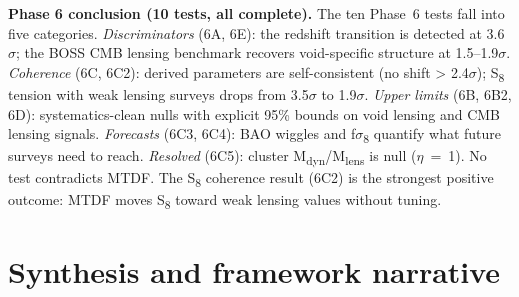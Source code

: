 \documentclass[11pt,a4paper]{article}
\begin{document}
\begin{mdframed}[linecolor=accent,linewidth=0.5pt,backgroundcolor=callout-bg,leftline=true,rightline=true,topline=true,bottomline=true,innerleftmargin=8pt,innerrightmargin=8pt,innertopmargin=6pt,innerbottommargin=6pt]
\textbf{Phase 6 conclusion (10 tests, all complete).}
The ten Phase~6 tests fall into five categories. \emph{Discriminators} (6A, 6E): the redshift transition is detected at 3.6$\sigma$; the BOSS CMB lensing benchmark recovers void-specific structure at 1.5--1.9$\sigma$. \emph{Coherence} (6C, 6C2): derived parameters are self-consistent (no shift > 2.4$\sigma$); S\textsubscript{8} tension with weak lensing surveys drops from 3.5$\sigma$ to 1.9$\sigma$. \emph{Upper limits} (6B, 6B2, 6D): systematics-clean nulls with explicit 95\% bounds on void lensing and CMB lensing signals. \emph{Forecasts} (6C3, 6C4): BAO wiggles and f$\sigma$\textsubscript{8} quantify what future surveys need to reach. \emph{Resolved} (6C5): cluster M\textsubscript{dyn}/M\textsubscript{lens} is null ($\eta$~=~1). No test contradicts MTDF. The S\textsubscript{8} coherence result (6C2) is the strongest positive outcome: MTDF moves S\textsubscript{8} toward weak lensing values without tuning.
\end{mdframed}

\section{Synthesis and framework narrative}
\label{sec:sec7}
\end{document}

